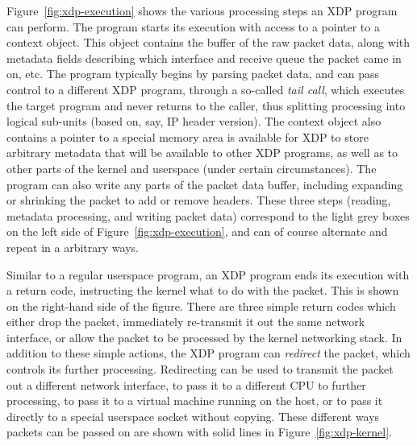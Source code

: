 \documentclass[10pt,sigconf]{acmart}
\begin{document}
Figure~\ref{fig:xdp-execution} shows the various processing steps an XDP program
can perform. The program starts its execution with access to a pointer to a
context object. This object contains the buffer of the raw packet data, along
with metadata fields describing which interface and receive queue the packet
came in on, etc. The program typically begins by parsing packet data, and can
pass control to a different XDP program, through a so-called \emph{tail call},
which executes the target program and never returns to the caller, thus
splitting processing into logical sub-units (based on, say, IP header version).
The context object also contains a pointer to a special memory area is available
for XDP to store arbitrary metadata that will be available to other XDP
programs, as well as to other parts of the kernel and userspace (under certain
circumstances). The program can also write any parts of the packet data buffer,
including expanding or shrinking the packet to add or remove headers. These
three steps (reading, metadata processing, and writing packet data) correspond
to the light grey boxes on the left side of Figure~\ref{fig:xdp-execution}, and
can of course alternate and repeat in a arbitrary ways.

Similar to a regular userspace program, an XDP program ends its execution with a
return code, instructing the kernel what to do with the packet. This is shown on
the right-hand side of the figure. There are three simple return codes which
either drop the packet, immediately re-transmit it out the same network
interface, or allow the packet to be processed by the kernel networking stack.
In addition to these simple actions, the XDP program can \emph{redirect} the
packet, which controls its further processing. Redirecting can be used to
transmit the packet out a different network interface, to pass it to a different
CPU to further processing, to pass it to a virtual machine running on the host,
or to pass it directly to a special userspace socket without copying. These
different ways packets can be passed on are shown with solid lines in
Figure~\ref{fig:xdp-kernel}.
\end{document}
